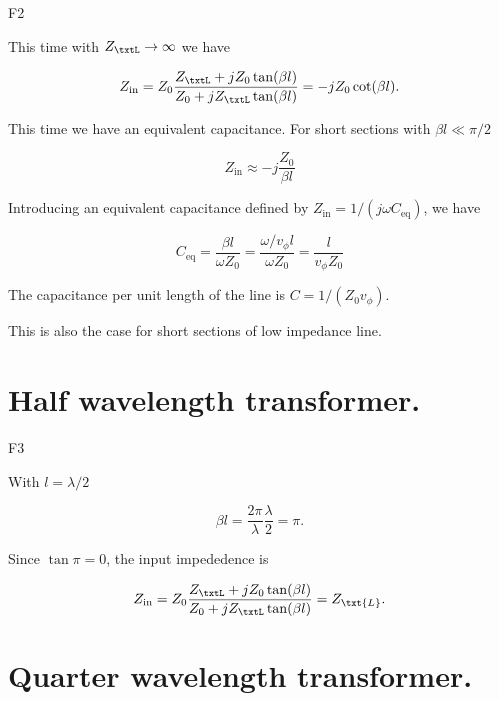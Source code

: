 F2

This time with \( Z_\txtL \rightarrow \infty \) we have

\begin{dmath}\label{eqn:uwavesDeck5SmithChartCore:120}
Z_{\textrm{in}} 
= Z_0 \frac{ Z_\txtL + j Z_0 \tan(\beta l) }{ Z_0 + j Z_\txtL \tan(\beta l)}
= -j Z_0 \cot(\beta l).
\end{dmath}

This time we have an equivalent capacitance.  For short sections with \( \beta l \ll \pi/2 \)

\begin{dmath}\label{eqn:uwavesDeck5SmithChartCore:140}
Z_{\textrm{in}}
\approx
-j \frac{Z_0}{\beta l}
\end{dmath}

Introducing an equivalent capacitance defined by \( Z_{\textrm{in}} = 1/(j \omega C_{\mathrm{eq}}) \), we have

\begin{dmath}\label{eqn:uwavesDeck5SmithChartCore:160}
C_{\mathrm{eq}}
=
\frac{ \beta l}{\omega Z_0}
=
\frac{ \omega/v_\phi l}{\omega Z_0}
=
\frac{ l}{v_\phi Z_0}
\end{dmath}

The capacitance per unit length of the line is \( C = 1/(Z_0 v_\phi) \).

This is also the case for short sections of low impedance line.

\section{Half wavelength transformer.}

F3

With \( l = \lambda/2 \)

\begin{dmath}\label{eqn:uwavesDeck5SmithChartCore:180}
\beta l 
= \frac{2 \pi}{\lambda} \frac{\lambda}{2}
= \pi.
\end{dmath}

Since \( \tan \pi = 0 \), the input impededence is

\begin{dmath}\label{eqn:uwavesDeck5SmithChartCore:200}
Z_{\textrm{in}} 
= Z_0 \frac{ Z_\txtL + j Z_0 \tan(\beta l) }{ Z_0 + j Z_\txtL \tan(\beta l)}
= Z_\txt{L}.
\end{dmath}

\section{Quarter wavelength transformer.}

